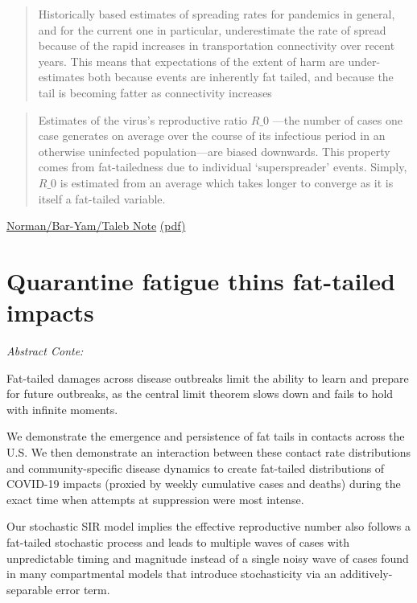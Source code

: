 \documentclass[
]{book}
\begin{document}
\begin{quote}
Historically based estimates of spreading
rates for pandemics in general, and for the current one in
particular, underestimate the rate of spread because of the
rapid increases in transportation connectivity over recent years.
This means that expectations of the extent of harm are under-
estimates both because events are inherently fat tailed, and
because the tail is becoming fatter as connectivity increases
\end{quote}

\begin{quote}
Estimates of the virus's reproductive
ratio \(R\_{0}\) ---the number of cases one case generates on average
over the course of its infectious period in an otherwise
uninfected population---are biased downwards. This property
comes from fat-tailedness due to individual `superspreader'
events. Simply,\(R\_{0}\) is estimated from an average which takes
longer to converge as it is itself a fat-tailed variable.
\end{quote}

\href{https://necsi.edu/systemic-risk-of-pandemic-via-novel-pathogens-coronavirus-\%20a-note}{Norman/Bar-Yam/Taleb Note}
\href{/pdf/Joseph_Norman_2020_Systemic_Risk_of_Pandemic_via_Novel_Pathogenes.pdf}{(pdf)}

\hypertarget{quarantine-fatigue-thins-fat-tailed-impacts}{%
\section{Quarantine fatigue thins fat-tailed impacts}\label{quarantine-fatigue-thins-fat-tailed-impacts}}

\emph{Abstract Conte:}

Fat-tailed damages across disease outbreaks limit the
ability to learn and prepare for future outbreaks,
as the central limit theorem slows down and fails
to hold with infinite moments.

We demonstrate the emergence and persistence of fat tails in contacts across the U.S.
We then demonstrate an interaction between these contact rate distributions
and community-specific disease dynamics
to create fat-tailed distributions of COVID-19 impacts
(proxied by weekly cumulative cases and deaths) during the
exact time when attempts at suppression were most intense.

Our stochastic SIR model implies the effective reproductive number
also follows a fat-tailed stochastic process and leads to multiple waves of
cases with unpredictable timing and magnitude instead of a single noisy wave of cases
found in many compartmental models
that introduce stochasticity via an additively-separable error term.
\end{document}
